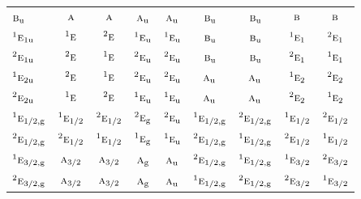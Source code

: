 \documentclass[10pt,a4paper]{article}
\numberwithin{equation}{section}
\newcommand{\irr}[1]{\text{\normalfont\scshape #1}}
\newcommand{\conjpair}[1]{{}^{#1}}
\newcommand{\ptag}[1]{\mathrm{#1}}
\begin{document}
{\begin{longtable}{@{}lcccccccc@{}}
$\irr{b}_{\ptag{u}}$ & $\irr{a}$ & $\irr{a}$ & $\irr{a}_{\ptag{u}}$ & $\irr{a}_{\ptag{u}}$ & $\irr{b}_{\ptag{u}}$ & $\irr{b}_{\ptag{u}}$ & $\irr{b}$ & $\irr{b}$\\
$\conjpair{1}\irr{e}_{1\ptag{u}}$ & $\conjpair{1}\irr{e}$ & $\conjpair{2}\irr{e}$ & $\conjpair{1}\irr{e}_{\ptag{u}}$ & $\conjpair{1}\irr{e}_{\ptag{u}}$ & $\irr{b}_{\ptag{u}}$ & $\irr{b}_{\ptag{u}}$ & $\conjpair{1}\irr{e}_{1}$ & $\conjpair{2}\irr{e}_{1}$\\
$\conjpair{2}\irr{e}_{1\ptag{u}}$ & $\conjpair{2}\irr{e}$ & $\conjpair{1}\irr{e}$ & $\conjpair{2}\irr{e}_{\ptag{u}}$ & $\conjpair{2}\irr{e}_{\ptag{u}}$ & $\irr{b}_{\ptag{u}}$ & $\irr{b}_{\ptag{u}}$ & $\conjpair{2}\irr{e}_{1}$ & $\conjpair{1}\irr{e}_{1}$\\
$\conjpair{1}\irr{e}_{2\ptag{u}}$ & $\conjpair{2}\irr{e}$ & $\conjpair{1}\irr{e}$ & $\conjpair{2}\irr{e}_{\ptag{u}}$ & $\conjpair{2}\irr{e}_{\ptag{u}}$ & $\irr{a}_{\ptag{u}}$ & $\irr{a}_{\ptag{u}}$ & $\conjpair{1}\irr{e}_{2}$ & $\conjpair{2}\irr{e}_{2}$\\
$\conjpair{2}\irr{e}_{2\ptag{u}}$ & $\conjpair{1}\irr{e}$ & $\conjpair{2}\irr{e}$ & $\conjpair{1}\irr{e}_{\ptag{u}}$ & $\conjpair{1}\irr{e}_{\ptag{u}}$ & $\irr{a}_{\ptag{u}}$ & $\irr{a}_{\ptag{u}}$ & $\conjpair{2}\irr{e}_{2}$ & $\conjpair{1}\irr{e}_{2}$\\
$\conjpair{1}\irr{e}_{1/2,\ptag{g}}$ & $\conjpair{1}\irr{e}_{1/2}$ & $\conjpair{2}\irr{e}_{1/2}$ & $\conjpair{2}\irr{e}_{\ptag{g}}$ & $\conjpair{2}\irr{e}_{\ptag{u}}$ & $\conjpair{1}\irr{e}_{1/2,\ptag{g}}$ & $\conjpair{2}\irr{e}_{1/2,\ptag{g}}$ & $\conjpair{1}\irr{e}_{1/2}$ & $\conjpair{2}\irr{e}_{1/2}$\\
$\conjpair{2}\irr{e}_{1/2,\ptag{g}}$ & $\conjpair{2}\irr{e}_{1/2}$ & $\conjpair{1}\irr{e}_{1/2}$ & $\conjpair{1}\irr{e}_{\ptag{g}}$ & $\conjpair{1}\irr{e}_{\ptag{u}}$ & $\conjpair{2}\irr{e}_{1/2,\ptag{g}}$ & $\conjpair{1}\irr{e}_{1/2,\ptag{g}}$ & $\conjpair{2}\irr{e}_{1/2}$ & $\conjpair{1}\irr{e}_{1/2}$\\
$\conjpair{1}\irr{e}_{3/2,\ptag{g}}$ & $\irr{a}_{3/2}$ & $\irr{a}_{3/2}$ & $\irr{a}_{\ptag{g}}$ & $\irr{a}_{\ptag{u}}$ & $\conjpair{2}\irr{e}_{1/2,\ptag{g}}$ & $\conjpair{1}\irr{e}_{1/2,\ptag{g}}$ & $\conjpair{1}\irr{e}_{3/2}$ & $\conjpair{2}\irr{e}_{3/2}$\\
$\conjpair{2}\irr{e}_{3/2,\ptag{g}}$ & $\irr{a}_{3/2}$ & $\irr{a}_{3/2}$ & $\irr{a}_{\ptag{g}}$ & $\irr{a}_{\ptag{u}}$ & $\conjpair{1}\irr{e}_{1/2,\ptag{g}}$ & $\conjpair{2}\irr{e}_{1/2,\ptag{g}}$ & $\conjpair{2}\irr{e}_{3/2}$ & $\conjpair{1}\irr{e}_{3/2}$\\

\end{longtable}}
\end{document}
